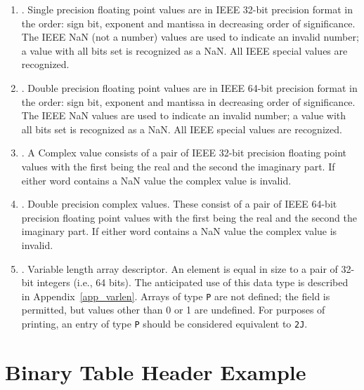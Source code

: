 \begin{enumerate}
\item {}. Single precision floating point values are in IEEE
32-bit precision format in the order: sign bit, exponent and mantissa
in decreasing order of significance. The IEEE NaN (not a number)
values are used to indicate an invalid number; a value with all bits
set is recognized as a NaN. All IEEE special values are recognized.

\item {}.  Double precision floating point values are in IEEE
64-bit precision format in the order: sign bit, exponent and mantissa
in decreasing order of significance.  The IEEE NaN values are used to
indicate an invalid number; a value with all bits set is recognized as
a NaN. All IEEE special values are recognized.

\item {}.  A Complex value consists of a pair of IEEE 32-bit
precision floating point values with the first being the real and the
second the imaginary part.  If either word contains a NaN value the
complex value is invalid.

\item {}. Double precision complex values.  These consist of a
pair of IEEE 64-bit precision floating point values with the first
being the real and the second the imaginary part.  If either word
contains a NaN value the complex value is invalid.

\item {}. Variable length array descriptor.  An element is equal
in size to a pair of 32-bit integers (i.e., 64 bits).  The anticipated
use of this data type is described in Appendix~\ref{app_varlen}.
Arrays of type \verb|P| are not defined; the  field is
permitted, but values other than 0 or 1 are undefined.  For purposes
of printing, an entry of type \verb|P| should be considered equivalent
to \verb|2J|.

\end{enumerate} %

\section{Binary Table Header Example }

